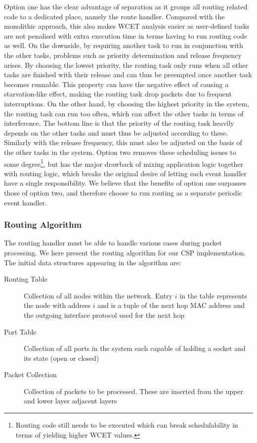 Option one has the clear advantage of separation as it groups all routing related code to a dedicated place, namely the route handler. Compared with the monolithic approach, this also makes WCET analysis easier as user-defined tasks are not penalised with extra execution time in terms having to run routing code as well. On the downside, by requiring another task to run in conjunction with the other tasks, problems such as priority determination and release frequency arises. By choosing the lowest priority, the routing task only runs when all other tasks are finished with their release and can thus be preempted once another task becomes runnable. This property can have the negative effect of causing a starvation-like effect, making the routing task drop packets due to frequent interruptions. On the other hand, by choosing the highest priority in the system, the routing task can run too often, which can affect the other tasks in terms of interference. The bottom line is that the priority of the routing task heavily depends on the other tasks and must thus be adjusted according to these. Similarly with the release frequency, this must also be adjusted on the basis of the other tasks in the system. Option two removes these scheduling issues to some degree\footnote{Routing code still needs to be executed which can break schedulability in terms of yielding higher WCET values.}, but has the major drawback of mixing application logic together with routing logic, which breaks the original desire of letting each event handler have a single responsibility. We believe that the benefits of option one surpasses those of option two, and therefore choose to run routing as a separate periodic event handler.

\subsubsection{Routing Algorithm}
The routing handler must be able to handle various cases during packet processing. We here present the routing algorithm for our CSP implementation. The initial data structures appearing in the algorithm are:

\begin{description}
	\item[Routing Table] Collection of all nodes within the network. Entry $i$ in the table represents the node with address $i$ and is a tuple of the next hop MAC address and the outgoing interface protocol used for the next hop 
	\item[Port Table] Collection of all ports in the system each capable of holding a socket and its state (open or closed)
	\item[Packet Collection] Collection of packets to be processed. These are inserted from the upper and lower layer adjacent layers
\end{description} 

